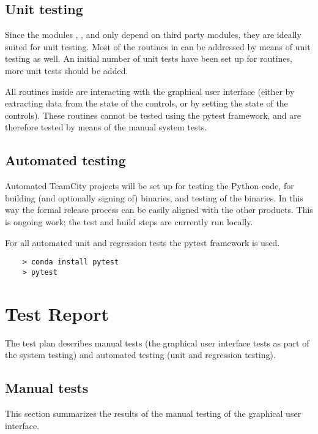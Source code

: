\section{Unit testing}

Since the modules , ,  and  only depend on third party modules, they are ideally suited for unit testing.
Most of the routines in  can be addressed by means of unit testing as well.
An initial number of unit tests have been set up for  routines, more unit tests should be added.

All routines inside  are interacting with the graphical user interface (either by extracting data from the state of the controls, or by setting the state of the controls).
These routines cannot be tested using the pytest framework, and are therefore tested by means of the manual system tests.

\section{Automated testing}

Automated TeamCity projects will be set up for testing the Python code, for building (and optionally signing of) binaries, and testing of the binaries.
In this way the formal release process can be easily aligned with the other products.
This is ongoing work; the test and build steps are currently run locally.

For all automated unit and regression tests the pytest framework is used.

\begin{Verbatim}
    > conda install pytest
    > pytest
\end{Verbatim}

\chapter{Test Report} \label{Chp:TestReport}

The test plan describes manual tests (the graphical user interface tests as part of the system testing) and automated testing (unit and regression testing).

\section{Manual tests}

This section summarizes the results of the manual testing of the graphical user interface.

